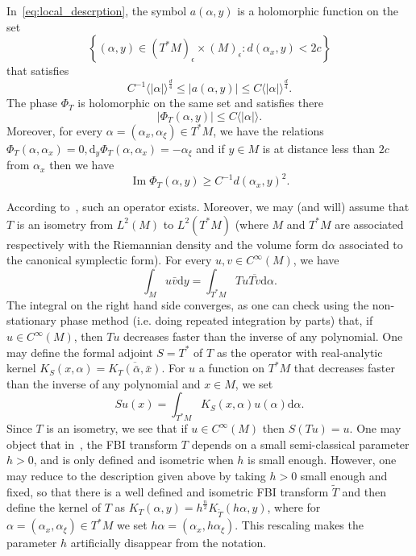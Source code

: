 \documentclass[10pt]{amsart}
\theoremstyle{definition}\newtheorem{defi}[theo]{Definition}\newtheorem{rema}[theo]{Remark}\newtheorem{exam}[theo]{Example}\newtheorem{exem}[theo]{Example}\newtheorem{nota}[theo]{Notation}
\DeclareMathOperator{\im}{Im}
\newcommand{\set}[1]{\left\{ #1 \right\}}
\newcommand{\va}[1]{\left|#1\right|}
\newcommand{\brac}[1]{\langle #1 \rangle}
\newcommand{\rmd}{\mathrm{d}}
\begin{document}
In~\eqref{eq:local_descrption}, the symbol $a(\alpha,y)$ is a holomorphic function on the set
\[
\set{ (\alpha,y) \in (T^* M)_\epsilon \times (M)_\epsilon: d(\alpha_x,y) < 2c}
\]
that satisfies
\begin{equation*}
C^{-1} \brac{\va{\alpha}}^{\frac{d}{4}} \leq \va{a(\alpha,y)} \leq C \brac{\va{\alpha}}^{\frac{d}{4}}.
\end{equation*}
The phase $\Phi_T$ is holomorphic on the same set and satisfies there
\begin{equation}\label{eq:control_phase}
\va{\Phi_T(\alpha,y)} \leq C \brac{\va{\alpha}}.
\end{equation}
Moreover, for every $\alpha = (\alpha_x,\alpha_\xi) \in T^* M$, we have the relations $\Phi_T(\alpha,\alpha_x) = 0, \rmd _y \Phi_T(\alpha,\alpha_x)= - \alpha_\xi$ and if $y \in M$ is at distance less than $2c$ from $\alpha_x$ then we have
\begin{equation}\label{eq:coercivity_phase}
\im \Phi_T(\alpha,y) \geq C^{-1} d(\alpha_x,y)^2.
\end{equation}

According to~\cite[Theorem~6]{BJ20}, such an operator exists. Moreover, we may (and will) assume that $T$ is an isometry from $L^2(M)$ to $L^2(T^* M)$ (where $M$ and $T^* M$ are associated respectively with the Riemannian density and the volume form $\rmd \alpha$ associated to the canonical symplectic form). For every $u,v \in C^\infty(M)$, we have
\begin{equation*}
\int_M u \bar{v} \rmd y = \int_{T^* M} Tu \overline{T v} \rmd \alpha.
\end{equation*}
The integral on the right hand side converges, as one can check using the non-stationary phase method (i.e. doing repeated integration by parts) that, if $u \in C^\infty(M)$, then $Tu$ decreases faster than the inverse of any polynomial. One may define the formal adjoint $S = T^*$ of $T$ as the operator with real-analytic kernel $K_S(x,\alpha) = \overline{K_T(\bar{\alpha},\bar{x})}$. For $u$ a function on $T^* M$ that decreases faster than the inverse of any polynomial and $x \in M$, we set
\begin{equation*}
S u (x) = \int_{T^* M} K_S(x,\alpha) u(\alpha) \rmd \alpha.
\end{equation*}
Since $T$ is an isometry, we see that if $u \in C^\infty(M)$ then $S(Tu) = u$. One may object that in~\cite{BJ20}, the FBI transform $T$ depends on a small semi-classical parameter $h > 0$, and is only defined and isometric when $h$ is small enough. However, one may reduce to the description given above by taking $h > 0$ small enough and fixed, so that there is a well defined and isometric FBI transform $\widetilde{T}$ and then define the kernel of $T$ as $K_T(\alpha,y) = h^{\frac{n}{2}} K_{\widetilde{T}}(h\alpha,y)$, where for $\alpha = (\alpha_x,\alpha_\xi) \in T^* M$ we set $h \alpha = (\alpha_x,h \alpha_\xi)$. This rescaling makes the parameter $h$ artificially disappear from the notation.
\end{document}
